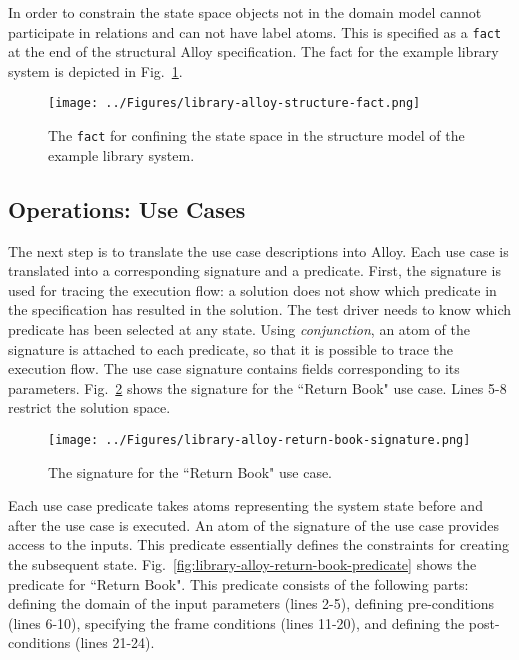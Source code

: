 In order to constrain the state space objects not in the domain model cannot participate in relations and can not have label atoms. This is specified as a \texttt{fact} at the end of the structural Alloy specification. The fact for the example library system is depicted in Fig.~\ref{fig:library-alloy-structure-fact}.

\begin{figure}[h]
\centering
\texttt{[image: ../Figures/library-alloy-structure-fact.png]}
\caption{The \texttt{fact} for confining the state space in the structure model of the example library system.}
\label{fig:library-alloy-structure-fact}
\end{figure}


\subsection{Operations: Use Cases}
\label{sec:alloy-usecases}
The next step is to translate the use case descriptions into Alloy. Each use case is translated into a corresponding signature and a predicate. First, the signature is used for tracing the execution flow: a solution does not show which predicate in the specification has resulted in the solution. The test driver needs to know which predicate has been selected at any state. Using \textit{conjunction}, an atom of the signature is attached to each predicate, so that it is possible to trace the execution flow. The use case signature contains fields corresponding to its parameters. Fig.~\ref{fig:library-alloy-return-book-signature} shows the signature for the ``Return Book" use case. Lines 5-8 restrict the solution space.

\begin{figure}[h]
\centering
\texttt{[image: ../Figures/library-alloy-return-book-signature.png]}
\caption{The signature for the ``Return Book" use case.}
\label{fig:library-alloy-return-book-signature}
\end{figure}

Each use case predicate takes atoms representing the system state before and after the use case is executed. An atom of the signature of the use case provides access to the inputs. This predicate essentially defines the constraints for creating the subsequent state. Fig.~\ref{fig:library-alloy-return-book-predicate} shows the predicate for ``Return Book". This predicate consists of the following parts: defining the domain of the input parameters (lines 2-5), defining pre-conditions (lines 6-10), specifying the frame conditions (lines 11-20), and defining the post-conditions (lines 21-24). 

